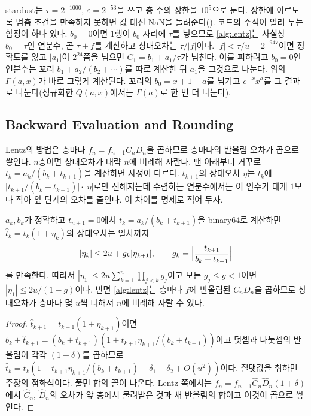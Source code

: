 stardust는 $\tau=2^{-1000}$, $\varepsilon=2^{-53}$을 쓰고 층 수의 상한을 $10^5$으로 둔다. 상한에 이르도록 멈춤 조건을 만족하지 못하면 값 대신 NaN을 돌려준다(). 코드의 주석이 일러 두는 함정이 하나 있다. $b_0=0$이면 1행이 $b_0$ 자리에 $\tau$를 넣으므로 \cref{alg:lentz}는 사실상 $b_0=\tau$인 연분수, 곧 $\tau+f$를 계산하고 상대오차는 $\tau/|f|$이다. $|f|<\tau/u=2^{-947}$이면 정확도를 잃고 $|a_1|$이 $2^{24}$쯤을 넘으면 $C_1=b_1+a_1/\tau$가 넘친다. 이를 피하려고 $b_0=0$인 연분수는 꼬리 $b_1+a_2/(b_2+\cdots)$를 따로 계산한 뒤 $a_1$을 그것으로 나눈다. 위의 $\Gamma(a,x)$가 바로 그렇게 계산된다. 꼬리의 $b_0=x+1-a$를 넘기고 $e^{-x}x^a$를 그 결과로 나눈다(정규화한 $Q(a,x)$에서는 $\Gamma(a)$로 한 번 더 나눈다).

\subsection{Backward Evaluation and Rounding}

Lentz의 방법은 층마다 $f_n=f_{n-1}C_nD_n$을 곱하므로 층마다의 반올림 오차가 곱으로 쌓인다. $n$층이면 상대오차가 대략 $n$에 비례해 자란다. 맨 아래부터 거꾸로 $t_k=a_k/(b_k+t_{k+1})$을 계산하면 사정이 다르다. $t_{k+1}$의 상대오차 $\eta$는 $t_k$에 $\bigl|t_{k+1}/(b_k+t_{k+1})\bigr|\cdot|\eta|$로만 전해지는데 수렴하는 연분수에서는 이 인수가 대개 $1$보다 작아 앞 단계의 오차를 줄인다. 이 차이를 명제로 적어 두자.

\begin{proposition}
\label{prop:cf-rounding}
$a_k,b_k$가 정확하고 $t_{n+1}=0$에서 $t_k=a_k/(b_k+t_{k+1})$을 binary64로 계산하면 $\hat t_k=t_k(1+\eta_k)$의 상대오차는 일차까지
\[
|\eta_k|\le2u+g_k|\eta_{k+1}|,\qquad g_k=\Bigl|\frac{t_{k+1}}{b_k+t_{k+1}}\Bigr|
\]
를 만족한다. 따라서 $|\eta_1|\le2u\sum_{k=1}^n\prod_{j<k}g_j$이고 모든 $g_j\le g<1$이면 $|\eta_1|\le2u/(1-g)$이다. 반면 \cref{alg:lentz}는 층마다 $f$에 반올림된 $C_nD_n$을 곱하므로 상대오차가 층마다 몇 $u$씩 더해져 $n$에 비례해 자랄 수 있다.
\end{proposition}

\begin{proof}
$\hat t_{k+1}=t_{k+1}(1+\eta_{k+1})$이면 $b_k+\hat t_{k+1}=(b_k+t_{k+1})(1+t_{k+1}\eta_{k+1}/(b_k+t_{k+1}))$이고 덧셈과 나눗셈의 반올림이 각각 $(1+\delta)$를 곱하므로 $\hat t_k=t_k(1-t_{k+1}\eta_{k+1}/(b_k+t_{k+1})+\delta_1+\delta_2+O(u^2))$이다. 절댓값을 취하면 주장의 점화식이다. 풀면 합의 꼴이 나온다. Lentz 쪽에서는 $f_n=f_{n-1}\hat C_n\hat D_n(1+\delta)$에서 $\hat C_n$, $\hat D_n$의 오차가 앞 층에서 물려받은 것과 새 반올림의 합이고 이것이 곱으로 쌓인다.
\end{proof}

